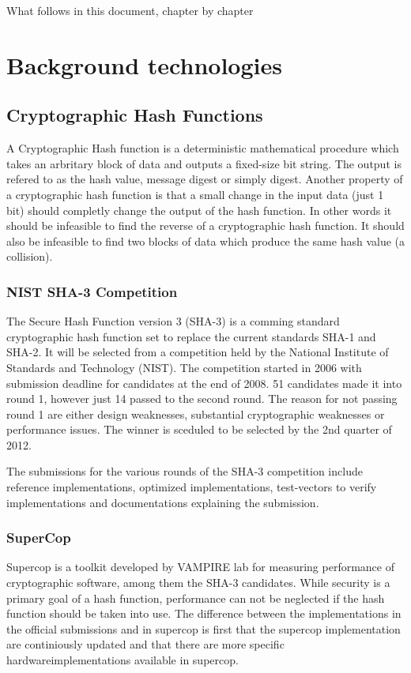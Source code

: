 \documentclass[english,12pt,a4paper]{book}
\begin{document}
What follows in this document, chapter by chapter


\chapter{Background technologies}

\section{Cryptographic Hash Functions}
A Cryptographic Hash function is a deterministic mathematical procedure which
takes an arbritary block of data and outputs a fixed-size bit string. The
output is refered to as the hash value, message digest or simply digest.
Another property of a cryptographic hash function is that a small change in the
input data (just 1 bit) should completly change the output of the hash
function. In other words it should be infeasible to find the reverse of a
cryptographic hash function. It should also be infeasible to find two blocks of
data which produce the same hash value (a collision).

\subsection{NIST SHA-3 Competition}
The Secure Hash Function version 3 (SHA-3) is a comming standard cryptographic
hash function set to replace the current standards SHA-1 and SHA-2.
It will be selected from a competition held by the National
Institute of Standards and Technology (NIST). The competition started in 2006
with submission deadline for candidates at the end of 2008. 51 candidates made
it into round 1, however just 14 passed to the second round. The reason for not
passing round 1 are either design weaknesses, substantial cryptographic
weaknesses or performance issues. The winner is sceduled to be selected by the 
2nd quarter of 2012.

The submissions for the various rounds of the SHA-3 competition include
reference implementations, optimized implementations, test-vectors to verify
implementations and documentations explaining the submission.

\subsection{SuperCop}
Supercop is a toolkit developed by VAMPIRE lab for measuring performance of
cryptographic software, among them the SHA-3 candidates. While security is a
primary goal of a hash function, performance can not be neglected if the hash
function should be taken into use. The difference between the implementations
in the official submissions and in supercop is first that the supercop
implementation are continiously updated and that there are more specific
hardwareimplementations available in supercop.
\end{document}
